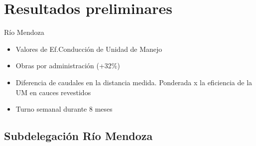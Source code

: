 \documentclass{beamer}\usepackage[]{graphicx}\usepackage[]{color}
\begin{document}
\section{Resultados preliminares}
\begin{frame}{Río Mendoza}
  \begin{itemize}
  \item Valores de Ef.Conducción de Unidad de Manejo
  \item Obras por administración (+32\%)
  \item Diferencia de caudales en la distancia medida. Ponderada x la eficiencia de la UM en cauces revestidos
  \item Turno semanal durante 8 meses
  \end{itemize}
\end{frame}

\subsection{Subdelegación Río Mendoza}
\end{document}
